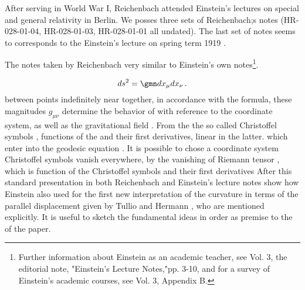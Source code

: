 After serving in World War I, Reichenbach attended Einstein's lectures on special and general relativity in Berlin. We posses three sets of Reichenbach;s notes (HR-028-01-04, HR-028-01-03, HR-028-01-01 all undated). The last set of notes seems to corresponds to the Einstein's lecture on spring term 1919 \citep{Einstein1919c}. {The notes taken by Reichenbach very similar to Einstein's own notes\footnote{Further information about Einstein as an academic teacher, see Vol. 3, the editorial note, "Einstein's Lecture Notes,"pp. 3-10, and for a survey of Einstein's academic courses, see Vol. 3, Appendix B.}.   

\begin{equation}\label{eq:lineelement}
ds^2=\gmn dx_\mu dx_\nu\,.
\end{equation}
%
between points indefinitely near together, in accordance with the formula, these magnitudes $g_{\mu \nu}$ determine the behavior of \rac with reference to the coordinate system, as well as the gravitational field \citep[028-01-04, 46]{HR}. From the \gmn the so called Christoffel symbols \christoffel{\mu}{\nu}{\tau}, functions of the \gmn and their first derivatives, linear in the latter. which enter into the geodesic equation \citep[028-01-04, 46, 2ff]{HR}. It is possible to chose a coordinate system Christoffel symbols vanish everywhere, by the vanishing of Riemann tensor \rite, which is function of the Christoffel symbols and their first derivatives  After this standard presentation in both Reichenbach and Einstein's lecture notes show how Einstein also used for the first new interpretation of the curvature in terms of the parallel displacement given by Tullio \citet{Levi-Civita1916} and Hermann \citet{Weyl1918}, who are mentioned explicitly. It is useful to sketch the fundamental ideas in order as premise to the of the paper.




}

